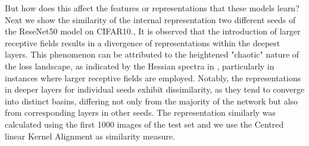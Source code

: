 But how does this affect the features or representations that these models learn? Next we show the similarity of the
internal representation two different seeds of the ReseNet50 model on CIFAR10., It is observed that the introduction of
larger receptive fields results in a divergence of representations within the deepest layers. This phenomenon can be
attributed to the heightened "chaotic" nature of the loss landscape, as indicated by the Hessian spectra in , particularly in instances where larger receptive fields are employed. Notably, the
representations in deeper layers for individual seeds exhibit dissimilarity, as they tend to converge into distinct
basins, differing not only from the majority of the network but also from corresponding layers in other seeds. The representation
 similarly was calculated using the first 1000 images of the test set and we use the Centred linear Kernel Alignment
 \citep{kornblithSimilarityNeuralNetwork2019} as similarity measure.
